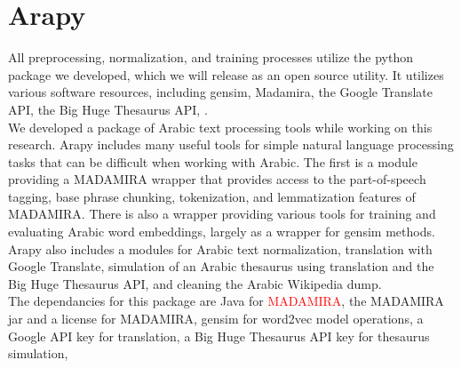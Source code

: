 \section{Arapy}
\label{sec:arapy}

All preprocessing, normalization, and training processes utilize the python package we developed, which we will release as an open source utility. It utilizes various software resources, including gensim, Madamira, the Google Translate API, the Big Huge Thesaurus API, \cite{google:online,bhl:online}. 
\\
We developed a package of Arabic text processing tools while working on this research. Arapy includes many useful tools for simple natural language processing tasks that can be difficult when working with Arabic. The first is a module providing a MADAMIRA wrapper that provides access to the part-of-speech tagging, base phrase chunking, tokenization, and lemmatization features of MADAMIRA. There is also a wrapper providing various tools for training and evaluating Arabic word embeddings, largely as a wrapper for gensim methods. Arapy also includes a modules for Arabic text normalization, translation with Google Translate, simulation of an Arabic thesaurus using translation and the Big Huge Thesaurus API, and cleaning the Arabic Wikipedia dump.
\\
The dependancies for this package are Java for \textcolor{red}{MADAMIRA}, the MADAMIRA jar and a license for MADAMIRA, gensim for word2vec model operations, a Google API key for translation, a Big Huge Thesaurus API key for thesaurus simulation, 
